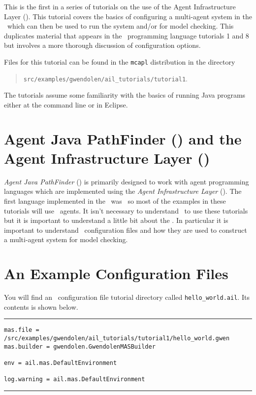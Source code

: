 
This is the first in a series of tutorials on the use of the Agent Infrastructure Layer (\ail).  This tutorial covers the basics of configuring a multi-agent system in the \ail\ which can then be used to run the system and/or for model checking.  This duplicates material that appears in the \gwendolen\ programming language tutorials 1 and 8 but involves a more thorough discussion of configuration options.

Files for this tutorial can be found in the \texttt{mcapl} distribution in the directory 
\begin{quote}
\texttt{src/examples/gwendolen/ail\_tutorials/tutorial1}.
\end{quote}

The tutorials assume some familiarity with the basics of running Java programs either at the command line or in Eclipse.

\section{Agent Java PathFinder (\ajpf) and the Agent Infrastructure Layer (\ail)}

\emph{Agent Java PathFinder} (\ajpf) is primarily designed to work with agent programming languages which are implemented using the \emph{Agent Infrastructure Layer} (\ail).  The first language implemented in the \ail\ was \gwendolen\ so most of the examples in these tutorials will use \gwendolen\ agents.  It isn't necessary to understand \gwendolen\ to use these tutorials but it is important to understand a little bit about the \ail.  In particular it is important to understand \ail\ configuration files and how they are used to construct a multi-agent system for model checking.

\section{An Example Configuration Files}

You will find an \ail\ configuration file tutorial directory called \texttt{hello\_world.ail}.  Its contents is shown below.

\noindent\rule{\textwidth}{1pt}
\begin{verbatim}
mas.file = /src/examples/gwendolen/ail_tutorials/tutorial1/hello_world.gwen
mas.builder = gwendolen.GwendolenMASBuilder

env = ail.mas.DefaultEnvironment

log.warning = ail.mas.DefaultEnvironment
\end{verbatim}
\rule{\textwidth}{1pt}

